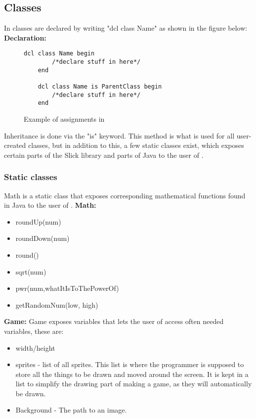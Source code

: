 \subsection{Classes}
In \lang{} classes are declared by writing "dcl class Name" as shown in the figure below:
\textbf{Declaration:}
\begin{figure}[H]
    \centering
    \begin{lstlisting}[style=gglang]
    dcl class Name begin
        /*declare stuff in here*/
    end

    dcl class Name is ParentClass begin
        /*declare stuff in here*/
    end
    \end{lstlisting}
    \caption{Example of assignments in \lang{}}\label{fig:classdcl}
\end{figure}
Inheritance is done via the "is" keyword. This method is what is used for all user-created classes, but in addition to this, a few static classes exist, which exposes certain parts of the Slick library and parts of Java to the user of \lang{}.
\subsubsection{Static classes}
Math is a static class that exposes corresponding mathematical functions found in Java to the user of \lang{}.
\textbf{Math:}
\begin{itemize}
    \item roundUp(num)
    \item roundDown(num)
    \item round()
    \item sqrt(num)
    \item pwr(num,whatItIsToThePowerOf)
    \item getRandomNum(low, high)
\end{itemize}

\textbf{Game:}
Game exposes variables that lets the user of \lang{} access often needed variables, these are:
\begin{itemize}
    \item width/height
    \item sprites - list of all sprites. This list is where the programmer is supposed to store all the things to be drawn and moved around the screen. It is kept in a list to simplify the drawing part of making a game, as they will automatically be drawn.
    \item Background - The path to an image.
\end{itemize}


